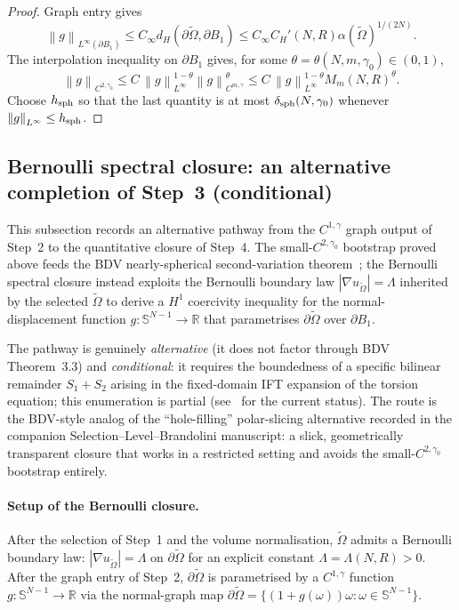 \documentclass[11pt]{amsart}
\theoremstyle{definition}
\newcommand{\R}{\mathbb R}
\newcommand{\Otil}{\widetilde\Omega}
\newcommand{\Sph}{\mathbb S^{N-1}}
\newcommand{\norm}[1]{\left\|#1\right\|}
\begin{document}
\begin{proof}
Graph entry gives
\[
\norm{g}_{L^\infty(\partial B_1)}
\le C_\infty d_H(\partial\widetilde\Omega,\partial B_1)
\le C_\infty C_H'(N,R)\alpha(\widetilde\Omega)^{1/(2N)}.
\]
The interpolation inequality on $\partial B_1$ gives, for some
$\theta=\theta(N,m,\gamma_0)\in(0,1)$,
\[
\norm{g}_{C^{2,\gamma_0}}
\le C\,\norm{g}_{L^\infty}^{1-\theta}
       \norm{g}_{C^{m,\gamma}}^\theta
\le C\,\norm{g}_{L^\infty}^{1-\theta}M_m(N,R)^\theta.
\]
Choose $h_{\rm sph}$ so that the last quantity is at most
$\delta_{\rm sph}(N,\gamma_0)$ whenever $\norm{g}_{L^\infty}\le h_{\rm sph}$.
\end{proof}



\subsection{Bernoulli spectral closure: an alternative completion of
Step~3 (conditional)}\label{sec:bernoulli-alt}

This subsection records an alternative pathway from the $C^{1,\gamma}$
graph output of Step~2 to the quantitative closure of Step~4.  The
small-$C^{2,\gamma_0}$ bootstrap proved above feeds the BDV
nearly-spherical second-variation
theorem~\cite[Theorem~3.3]{BDV2015}; the Bernoulli spectral closure
instead exploits the Bernoulli boundary law $|\nabla u_{\Otil}|=\Lambda$
inherited by the selected $\widetilde\Omega$ to derive a $H^1$
coercivity inequality for the normal-displacement function
$g:\Sph\to\R$ that parametrises $\partial\widetilde\Omega$ over
$\partial B_1$.

The pathway is genuinely \emph{alternative} (it does not factor
through BDV Theorem~3.3) and \emph{conditional}: it requires the
boundedness of a specific bilinear remainder $S_1+S_2$ arising in the
fixed-domain IFT expansion of the torsion equation; this enumeration
is partial (see~\cite[\S3]{Plan1-corrections-response} for the current
status).  The route is the BDV-style analog of the
``hole-filling'' polar-slicing alternative recorded in the companion
Selection--Level--Brandolini manuscript: a slick, geometrically
transparent closure that works in a restricted setting and avoids the
small-$C^{2,\gamma_0}$ bootstrap entirely.

\paragraph{Setup of the Bernoulli closure.}
After the selection of Step~1 and the volume normalisation, $\Otil$
admits a Bernoulli boundary law: $|\nabla u_{\Otil}|=\Lambda$ on
$\partial\Otil$ for an explicit constant $\Lambda=\Lambda(N,R)>0$.
After the graph entry of Step~2, $\partial\Otil$ is parametrised by
a $C^{1,\gamma}$ function $g:\Sph\to\R$ via the normal-graph map
$\partial\Otil=\{(1+g(\omega))\omega:\omega\in\Sph\}$.
\end{document}
